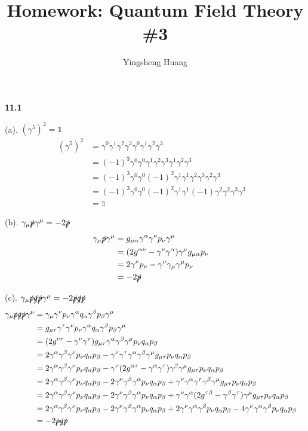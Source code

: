 \documentclass{article}
\title{Homework: Quantum Field Theory \#3}
\author{Yingsheng Huang}
\newcommand{\g}{\gamma}
\renewcommand{\a}{\alpha}
\renewcommand{\b}{\beta}
\newcommand{\ps}{\slashed p}
\begin{document}
\maketitle

{\bf11.1}\quad

(a). $(\gamma^5)^2=\mathds{1}$
\begin{align*}
  (\g^5)^2&=\g^0\g^1\g^2\g^3\g^0\g^1\g^2\g^3&\\
  &=(-1)^3\g^0\g^0\g^1\g^2\g^3\g^1\g^2\g^3\\
  &=(-1)^3\g^0\g^0(-1)^2\g^1\g^1\g^2\g^3\g^2\g^3\\
  &=(-1)^3\g^0\g^0(-1)^2\g^1\g^1(-1)\g^2\g^2\g^3\g^3\\
  &=\mathds{1}
\end{align*}


(b). $\g_{\mu}\slashed p\g^{\mu}=-2\slashed p$
\begin{align*}
  \g_{\mu}\ps\g^{\mu}&=g_{\mu\a}\g^{\a}\g^{\nu}p_{\nu}\g^{\mu}&\\
  &=(2g^{\a\nu}-\g^{\nu}\g^{\a})\g^{\mu}g_{\mu\a}p_{\nu}\\
  &=2\g^{\nu}p_{\nu}-\g^{\nu}\g_{\mu}\g^{\mu}p_{\nu}\\
  &=-2\ps
\end{align*}

(c). $\g_{\mu}\ps\slashed q \ps\g^{\mu}=-2\ps\slashed q\ps$
\begin{align*}
  \g_{\mu}\ps\slashed q \ps\g^{\mu}&=\g_{\mu}\g^{\nu}p_{\nu}\g^{\a}q_{\a}\g^{\b}p_{\b}\g^{\mu}&\\
  &=g_{\mu\tau}\g^{\tau}\g^{\nu}p_{\nu}\g^{\a}q_{\a}\g^{\b}p_{\b}\g^{\mu}\\
  &=(2g^{\nu\tau}-\g^{\nu}\g^{\tau})g_{\mu\tau}\g^{\a}\g^{\b}\g^{\mu}p_{\nu}q_{\a}p_{\b}\\
  &=2\g^{\a}\g^{\b}\g^{\nu}p_{\nu}q_{\a}p_{\b}-\g^{\nu}\g^{\tau}\g^{\a}\g^{\b}\g^{\mu}g_{\mu\tau}p_{\nu}q_{\a}p_{\b}\\
  &=2\g^{\a}\g^{\b}\g^{\nu}p_{\nu}q_{\a}p_{\b}-\g^{\nu}(2g^{\a\tau}-\g^{\a}\g^{\tau})\g^{\b}\g^{\mu}g_{\mu\tau}p_{\nu}q_{\a}p_{\b}\\
  &=2\g^{\a}\g^{\b}\g^{\nu}p_{\nu}q_{\a}p_{\b}-2\g^{\nu}\g^{\b}\g^{\a}p_{\nu}q_{\a}p_{\b}+\g^{\nu}\g^{\a}\g^{\tau}\g^{\b}\g^{\mu}g_{\mu\tau}p_{\nu}q_{\a}p_{\b}\\
  &=2\g^{\a}\g^{\b}\g^{\nu}p_{\nu}q_{\a}p_{\b}-2\g^{\nu}\g^{\b}\g^{\a}p_{\nu}q_{\a}p_{\b}+\g^{\nu}\g^{\a}(2g^{\tau\b}-\g^{\b}\g^{\tau})\g^{\mu}g_{\mu\tau}p_{\nu}q_{\a}p_{\b}\\
  &=2\g^{\a}\g^{\b}\g^{\nu}p_{\nu}q_{\a}p_{\b}-2\g^{\nu}\g^{\b}\g^{\a}p_{\nu}q_{\a}p_{\b}+2\g^{\nu}\g^{\a}\g^{\b}p_{\nu}q_{\a}p_{\b}-4\g^{\nu}\g^{\a}\g^{\b}p_{\nu}q_{\a}p_{\b}\\
  &=-2\ps\slashed q\ps
\end{align*}
\end{document}
